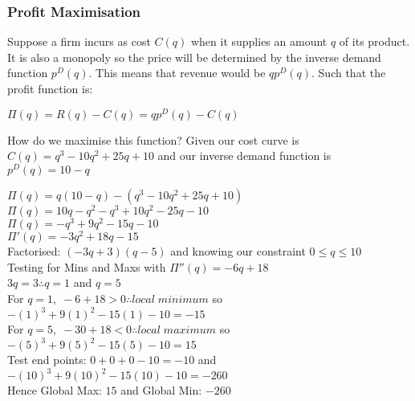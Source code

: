 \documentclass[12pt, letterpaper]{article}
\begin{document}
\subsubsection{Profit Maximisation}
Suppose a firm incurs as cost $C(q)$ when it supplies an amount $q$ of its product. It is also a monopoly so the price will be determined by the inverse demand function $p^D(q)$. This means that revenue would be $qp^D(q)$. Such that the profit function is:
\begin{center}
	$\Pi(q) = R(q) - C(q) = qp^D(q)-C(q)$
\end{center}
How do we maximise this function? Given our cost curve is $C(q) = q^3 - 10q^2 +25q + 10$
and our inverse demand function is $p^D(q) = 10-q$
\begin{center}
	$\Pi(q) = q(10-q) - (q^3 -10q^2 + 25q + 10)$\\
	$\Pi(q) = 10q-q^2 - q^3 + 10q^2 -25q -10$\\
	$\Pi(q) = -q^3 +9q^2 -15q -10$\\
	$\Pi '(q) = -3q^2 + 18q - 15$\\
	Factorised: $(-3q + 3)(q - 5)$ and knowing our constraint $0 \leq q \leq 10$\\
	Testing for Mins and Maxs with $\Pi ''(q) = -6q + 18$\\
	$3q=3 \therefore q= 1$ and $q=5$\\ 
	For $q=1,\; -6+18 > 0 \therefore local\;minimum$ so $-(1)^3+9(1)^2 - 15(1) - 10 = -15$\\
	For $q=5,\; -30+18<0 \therefore local\;maximum$ so $ -(5)^3+9(5)^2 -15(5) - 10 = 15$\\
	Test end points: $0 + 0 + 0 -10 =-10$ and $-(10)^3+9(10)^2-15(10)-10 = -260$\\
	Hence Global Max: $15$ and Global Min: $-260$
\end{center}
\end{document}
